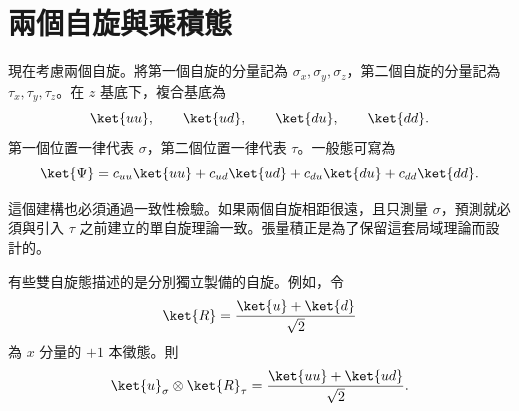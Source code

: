 \begin{classroomqa}
\end{classroomqa}

\section{兩個自旋與乘積態}

現在考慮兩個自旋。將第一個自旋的分量記為 \(\sigma_x,\sigma_y,\sigma_z\)，第二個自旋的分量記為 \(\tau_x,\tau_y,\tau_z\)。在 \(z\) 基底下，複合基底為
\begin{equation}
\ket{uu},\qquad \ket{ud},\qquad \ket{du},\qquad \ket{dd}.
\label{eq:l6-two-spin-basis}
\end{equation}
第一個位置一律代表 \(\sigma\)，第二個位置一律代表 \(\tau\)。一般態可寫為
\begin{equation}
\ket{\Psi}
=c_{uu}\ket{uu}+c_{ud}\ket{ud}
+c_{du}\ket{du}+c_{dd}\ket{dd}.
\label{eq:l6-general-two-spin}
\end{equation}

\begin{classroomqa}
\end{classroomqa}

這個建構也必須通過一致性檢驗。如果兩個自旋相距很遠，且只測量 \(\sigma\)，預測就必須與引入 \(\tau\) 之前建立的單自旋理論一致。張量積正是為了保留這套局域理論而設計的。

有些雙自旋態描述的是分別獨立製備的自旋。例如，令
\begin{equation}
\ket{R}=\frac{\ket{u}+\ket{d}}{\sqrt2}
\end{equation}
為 \(x\) 分量的 \(+1\) 本徵態。則
\begin{equation}
\ket{u}_{\sigma}\otimes\ket{R}_{\tau}
=\frac{\ket{uu}+\ket{ud}}{\sqrt2}.
\label{eq:l6-up-right-product}
\end{equation}

\begin{classroomqa}
\end{classroomqa}

